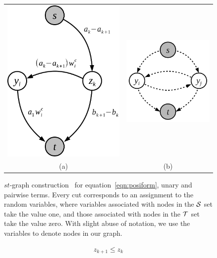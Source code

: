 \begin{figure}[t]
  \centering
  \setlength{\tabcolsep}{2pt}
  \begin{tabular}{cc}
    \includegraphics[width=0.45\columnwidth]{Methodology/figures/stmincut}&
                                                                         \includegraphics[width=0.5\columnwidth]{Methodology/figures/unary_pairwise.png}\\
                                                                         {\small (a)} & {\small (b)} 
  \end{tabular}
  \caption{\label{fig:stmincut} $st$-graph
    construction~\cite{gouldlearning} for
    equation~\eqref{eqn:posiform}, unary and pairwise terms.
    Every cut corresponds to an assignment to the random
    variables, where variables associated with nodes in the
    ${\cal S}$ set take the value one, and those associated with
    nodes in the ${\cal T}$ set take the value zero. With slight abuse
    of notation, we use the variables to denote nodes in our
    graph.}
\end{figure}

\begin{align}
  \label{eq:z_consecutive_constraint}
  z_{k+1} \leq z_k
\end{align}


